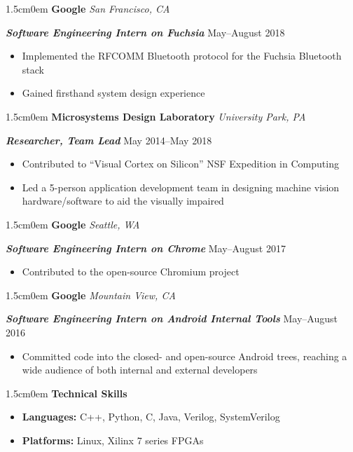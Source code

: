 \documentclass[letterpaper]{article}
\newcommand{\primaryindent}{1.5cm} %
\newenvironment{indented}{\begin{adjustwidth}{\primaryindent}{0em}}{\end{adjustwidth}}
\newenvironment{resumelist}{\begin{itemize}[topsep=0pt,noitemsep,itemindent=-15pt,leftmargin=30pt]}{\end{itemize}}
\newcommand{\generalentry}[5]{
	\begin{indented}
		\Large \textsf{\textbf{#1}} \hfill	%
			\hfill\normalsize\textit{#2} \par  			%
		\noindent \large \textsf{\textbf{\textit{#3}}} 	%
			\hfill \normalsize #4\par 					%
		\normalsize \normalfont #5 \par					%
		\normalsize \normalfont
	\end{indented}
	}
\begin{document}
\generalentry{Google}{San Francisco, CA}{Software Engineering Intern on Fuchsia}{May--August 2018}{
	\begin{resumelist}
		\item Implemented the RFCOMM Bluetooth protocol for the Fuchsia Bluetooth stack
		\item Gained firsthand system design experience
	\end{resumelist}
}
\vspace{2mm} %

\generalentry{Microsystems Design Laboratory}{University Park, PA}{Researcher, Team Lead}{May 2014--May 2018}{
	\begin{resumelist}
		\item Contributed to ``Visual Cortex on Silicon'' NSF Expedition in Computing
		\item Led a 5-person application development team in designing machine vision hardware/software to aid the visually impaired
	\end{resumelist}
}

\vspace{2mm}

\generalentry{Google}{Seattle, WA}{Software Engineering Intern on Chrome}{May--August 2017}{
	\begin{resumelist}
		\item Contributed to the open-source Chromium project
	\end{resumelist}
}
\vspace{2mm}

\generalentry{Google}{Mountain View, CA}{Software Engineering Intern on Android Internal Tools}{May--August 2016}{
	\begin{resumelist}
		\item Committed code into the closed- and open-source Android trees, reaching a wide audience of both internal and external developers
	\end{resumelist}
}

\vspace{2mm}
\begin{indented}
	\large \textsf{\textbf{Technical Skills}}
	\normalsize \normalfont \par
	\begin{resumelist}
		\item \textbf{Languages:} C++, Python, C, Java, Verilog, SystemVerilog
		\item \textbf{Platforms:} Linux, Xilinx 7 series FPGAs
	\end{resumelist}
\end{indented}
\end{document}
